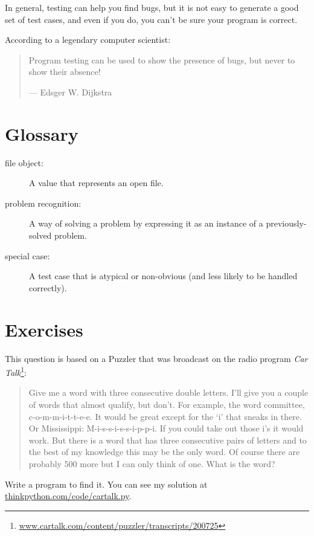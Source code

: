 \documentclass[10pt]{book}
\begin{document}
In general, testing can help you find bugs, but it is not easy to
generate a good set of test cases, and even if you do, you can't
be sure your program is correct.


According to a legendary computer scientist:

\begin{quote}
Program testing can be used to show the presence of bugs, but never to
show their absence!

--- Edsger W. Dijkstra
\end{quote}



\section{Glossary}

\begin{description}

\item[file object:] A value that represents an open file.

\item[problem recognition:] A way of solving a problem by
expressing it as an instance of a previously-solved problem.

\item[special case:] A test case that is atypical or non-obvious
(and less likely to be handled correctly).

\end{description}


\section{Exercises}

\begin{ex}


This question is based on a Puzzler that was broadcast on the radio
program {\em Car
  Talk}\footnote{\url{www.cartalk.com/content/puzzler/transcripts/200725}}:

\begin{quote}
Give me a word with three consecutive double letters. I'll give you a
couple of words that almost qualify, but don't. For example, the word
committee, c-o-m-m-i-t-t-e-e. It would be great except for the `i' that
sneaks in there. Or Mississippi: M-i-s-s-i-s-s-i-p-p-i. If you could
take out those i's it would work. But there is a word that has three
consecutive pairs of letters and to the best of my knowledge this may
be the only word. Of course there are probably 500 more but I can only
think of one. What is the word?
\end{quote}

Write a program to find it.  You can see my solution at
\url{thinkpython.com/code/cartalk.py}.

\end{ex}
\end{document}

